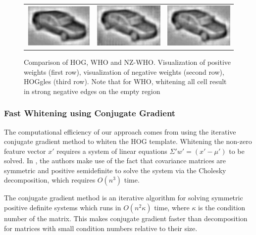 \documentclass[10pt,twocolumn,letterpaper]{article}
\begin{document}
\begin{figure}[t]
\begin{center}
\begin{tabular}{ccc}
     \includegraphics[width=0.28\linewidth]{ihog_hog200_crop.png} &
     \includegraphics[width=0.28\linewidth]{ihog_whiten_all200_crop.png} &
     \includegraphics[width=0.28\linewidth]{ihog_whiten_non_zero200_crop.png} \\
 \end{tabular}
  \end{center}
  \caption{Comparison of HOG, WHO and NZ-WHO. Visualization of positive weights (first row),  visualization of negative weights (second row), HOGgles \cite{vondrick2013} (third row). Note that for WHO, whitening all cell result in strong negative edges on the empty region}
  \label{fig:whocomparison}
\end{figure}


\subsubsection{Fast Whitening using Conjugate Gradient}

The computational efficiency of our approach comes from using the iterative
conjugate gradient method to whiten the HOG template. Whitening the non-zero
feature vector $x'$ requires a system of linear equations $\Sigma' w' = (x' -
\mu')$ to be solved. In
\cite{Hariharan12}, the authors make use of the fact that covariance matrices
are symmetric and positive semidefinite to solve the system via the Cholesky
decomposition, which requires $O(n^3)$ time.

The conjugate gradient method is an iterative algorithm for solving symmetric
positive definite systems which runs in $O(n^2\kappa)$ time, where $\kappa$ is
the condition number of the matrix.
This makes conjugate gradient faster than decomposition for matrices with small condition
numbers relative to their size.
\end{document}
